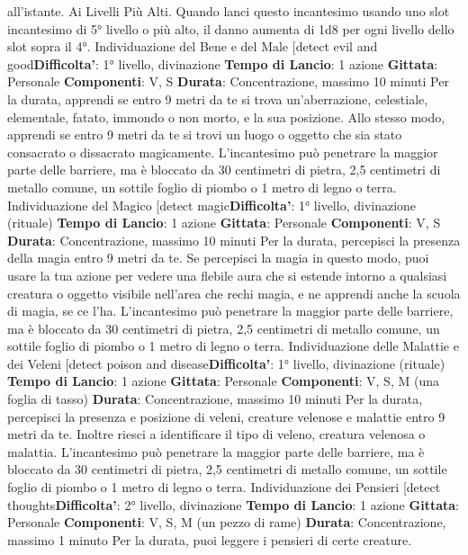 \begin{multicols}{2}
all’istante.
Ai Livelli Più Alti. Quando lanci questo incantesimo
usando uno slot incantesimo di 5° livello o più alto, il
danno aumenta di 1d8 per ogni livello dello slot sopra il
4°.
Individuazione del Bene e del Male
[detect evil and good\textbf{Difficolta'}:
1° livello, divinazione
\textbf{Tempo di Lancio}: 1 azione
\textbf{Gittata}: Personale
\textbf{Componenti}: V, S
\textbf{Durata}: Concentrazione, massimo 10 minuti
Per la durata, apprendi se entro 9 metri da te si trova
un’aberrazione, celestiale, elementale, fatato, immondo
o non morto, e la sua posizione. Allo stesso modo,
apprendi se entro 9 metri da te si trovi un luogo o
oggetto che sia stato consacrato o dissacrato
magicamente.
L’incantesimo può penetrare la maggior parte delle
barriere, ma è bloccato da 30 centimetri di pietra, 2,5
centimetri di metallo comune, un sottile foglio di piombo
o 1 metro di legno o terra.
Individuazione del Magico
[detect magic\textbf{Difficolta'}:
1° livello, divinazione (rituale)
\textbf{Tempo di Lancio}: 1 azione
\textbf{Gittata}: Personale
\textbf{Componenti}: V, S
\textbf{Durata}: Concentrazione, massimo 10 minuti
Per la durata, percepisci la presenza della magia entro
9 metri da te. Se percepisci la magia in questo modo,
puoi usare la tua azione per vedere una flebile aura che 
si estende intorno a qualsiasi creatura o oggetto visibile
nell’area che rechi magia, e ne apprendi anche la
scuola di magia, se ce l’ha.
L’incantesimo può penetrare la maggior parte delle
barriere, ma è bloccato da 30 centimetri di pietra, 2,5
centimetri di metallo comune, un sottile foglio di piombo
o 1 metro di legno o terra.
Individuazione delle Malattie e dei Veleni
[detect poison and disease\textbf{Difficolta'}:
1° livello, divinazione (rituale)
\textbf{Tempo di Lancio}: 1 azione
\textbf{Gittata}: Personale
\textbf{Componenti}: V, S, M (una foglia di tasso)
\textbf{Durata}: Concentrazione, massimo 10 minuti
Per la durata, percepisci la presenza e posizione di
veleni, creature velenose e malattie entro 9 metri da te.
Inoltre riesci a identificare il tipo di veleno, creatura
velenosa o malattia.
L’incantesimo può penetrare la maggior parte delle
barriere, ma è bloccato da 30 centimetri di pietra, 2,5
centimetri di metallo comune, un sottile foglio di piombo
o 1 metro di legno o terra.
Individuazione dei Pensieri
[detect thoughts\textbf{Difficolta'}:
2° livello, divinazione
\textbf{Tempo di Lancio}: 1 azione
\textbf{Gittata}: Personale
\textbf{Componenti}: V, S, M (un pezzo di rame)
\textbf{Durata}: Concentrazione, massimo 1 minuto
Per la durata, puoi leggere i pensieri di certe creature.

\end{multicols}
